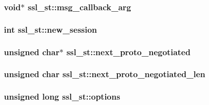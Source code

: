 \hypertarget{structssl__st_a265c0d1adbd1e76b1b326a1f82b0cfcf}{
\subsubsection[{msg\-\_\-callback\-\_\-arg}]{\setlength{\rightskip}{0pt plus 5cm}void$\ast$ ssl\-\_\-st\-::msg\-\_\-callback\-\_\-arg}}\label{structssl__st_a265c0d1adbd1e76b1b326a1f82b0cfcf}
\hypertarget{structssl__st_a5e265a8751b5a1641b71efda933a6b61}{
\subsubsection[{new\-\_\-session}]{\setlength{\rightskip}{0pt plus 5cm}int ssl\-\_\-st\-::new\-\_\-session}}\label{structssl__st_a5e265a8751b5a1641b71efda933a6b61}
\hypertarget{structssl__st_aef796f12c3e90c045baad0cd1841e180}{
\subsubsection[{next\-\_\-proto\-\_\-negotiated}]{\setlength{\rightskip}{0pt plus 5cm}unsigned char$\ast$ ssl\-\_\-st\-::next\-\_\-proto\-\_\-negotiated}}\label{structssl__st_aef796f12c3e90c045baad0cd1841e180}
\hypertarget{structssl__st_aa530fc5efd1d6b0f5f881dbd78b6d3de}{
\subsubsection[{next\-\_\-proto\-\_\-negotiated\-\_\-len}]{\setlength{\rightskip}{0pt plus 5cm}unsigned char ssl\-\_\-st\-::next\-\_\-proto\-\_\-negotiated\-\_\-len}}\label{structssl__st_aa530fc5efd1d6b0f5f881dbd78b6d3de}
\hypertarget{structssl__st_a82c8bfd123603c23ccca6fb45be6d75f}{
\subsubsection[{options}]{\setlength{\rightskip}{0pt plus 5cm}unsigned long ssl\-\_\-st\-::options}}\label{structssl__st_a82c8bfd123603c23ccca6fb45be6d75f}

